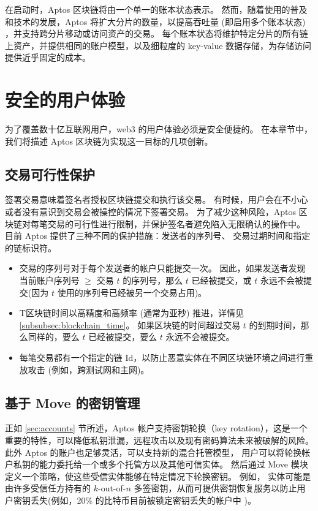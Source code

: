\documentclass{article}
\begin{document}
在启动时，Aptos 区块链将由一个单一的账本状态表示。 然而，随着使用的普及和技术的发展，Aptos 将扩大分片的数量，以提高吞吐量 (即启用多个账本状态) ，并支持跨分片移动或访问资产的交易。 每个账本状态将维护特定分片的所有链上资产，并提供相同的账户模型，以及细粒度的 key-value 数据存储，为存储访问提供近乎固定的成本。

\section{安全的用户体验}
\label{sec:user}

为了覆盖数十亿互联网用户，web3 的用户体验必须是安全便捷的。 在本章节中，我们将描述 Aptos 区块链为实现这一目标的几项创新。


\subsection{交易可行性保护}
\label{subsec:transaction_replay_protection}

签署交易意味着签名者授权区块链提交和执行该交易。 有时候，用户会在不小心或者没有意识到交易会被操控的情况下签署交易。 为了减少这种风险，Aptos 区块链对每笔交易的可行性进行限制，并保护签名者避免陷入无限确认的操作中。 目前 Aptos 提供了三种不同的保护措施：发送者的序列号、 交易过期时间和指定的链标识符。

\begin{itemize}
\item 交易的序列号对于每个发送者的帐户只能提交一次。 因此，如果发送者发现当前账户序列号 $\geq$  交易 $t$ 的序列号，那么 $t$ 已经被提交，或 $t$ 永远不会被提交(因为 $t$ 使用的序列号已经被另一个交易占用)。

\item T区块链时间以高精度和高频率 (通常为亚秒) 推进，详情见 \ref{subsubsec:blockchain_time}。 如果区块链的时间超过交易 $t$ 的到期时间，那么同样的，要么 $t$ 已经被提交，要么 $t$ 永远不会被提交。

\item 每笔交易都有一个指定的链 Id，以防止恶意实体在不同区块链环境之间进行重放攻击 (例如，跨测试网和主网)。

\end{itemize}

\subsection{基于 Move 的密钥管理}

正如 \ref{sec:accounts} 节所述，Aptos 帐户支持密钥轮换（key rotation），这是一个重要的特性，可以降低私钥泄漏，远程攻击以及现有密码算法未来被破解的风险。 此外 Aptos 的账户也足够灵活，可以支持新的混合托管模型， 用户可以将轮换帐户私钥的能力委托给一个或多个托管方以及其他可信实体。 然后通过 Move 模块定义一个策略，使这些受信实体能够在特定情况下轮换密钥。 例如， 实体可能是由许多受信任方持有的 $k$-out-of-$n$ 多签密钥，从而可提供密钥恢复服务以防止用户密钥丢失(例如，20\% 的比特币目前被锁定密钥丢失的帐户中 \cite{lost_passwords} )。
\end{document}
